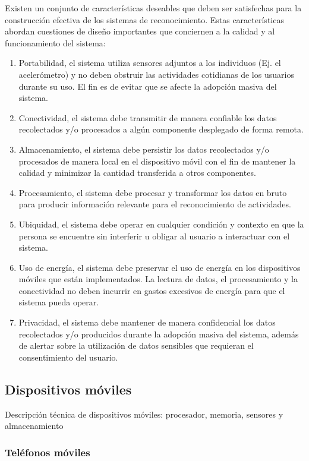 \label{sec431:caracteristicas}Existen un conjunto de características
deseables que deben ser satisfechas para la construcción efectiva
de los sistemas de reconocimiento. Estas características abordan cuestiones
de diseño importantes que conciernen a la calidad y al funcionamiento
del sistema:
\begin{enumerate}
\item Portabilidad, el sistema utiliza sensores adjuntos a los individuos
(Ej. el acelerómetro) y no deben obstruir las actividades cotidianas
de los usuarios durante su uso. El fin es de evitar que se afecte
la adopción masiva del sistema. 
\item Conectividad, el sistema debe transmitir de manera confiable los datos
recolectados y/o procesados a algún componente desplegado de forma
remota. 
\item Almacenamiento, el sistema debe persistir los datos recolectados y/o
procesados de manera local en el dispositivo móvil con el fin de mantener
la calidad y minimizar la cantidad transferida a otros componentes.
\item Procesamiento, el sistema debe procesar y transformar los datos en
bruto para producir información relevante para el reconocimiento de
actividades.
\item Ubiquidad, el sistema debe operar en cualquier condición y contexto
en que la persona se encuentre sin interferir u obligar al usuario
a interactuar con el sistema.
\item Uso de energía, el sistema debe preservar el uso de energía en los
dispositivos móviles que están implementados. La lectura de datos,
el procesamiento y la conectividad no deben incurrir en gastos excesivos
de energía para que el sistema pueda operar.
\item Privacidad, el sistema debe mantener de manera confidencial los datos
recolectados y/o producidos durante la adopción masiva del sistema,
además de alertar sobre la utilización de datos sensibles que requieran
el consentimiento del usuario.
\end{enumerate}

\subsection{Dispositivos móviles}

\label{sec432:dispositivos-moviles}Descripción técnica de dispositivos
móviles: procesador, memoria, sensores y almacenamiento

\subsubsection{Teléfonos móviles}

